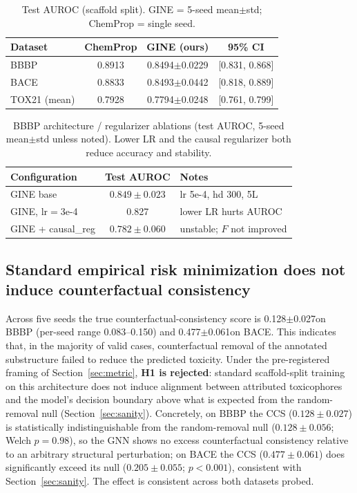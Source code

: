 \documentclass[conference]{IEEEtran}
\newcommand{\BBBPauc}{0.8494}
\newcommand{\BBBPaucsd}{0.0229}
\newcommand{\BACEauc}{0.8493}
\newcommand{\BACEaucsd}{0.0442}
\newcommand{\TOXauc}{0.7794}
\newcommand{\TOXaucsd}{0.0248}
\newcommand{\ChemBBBP}{0.8913}
\newcommand{\ChemBACE}{0.8833}
\newcommand{\ChemTOX}{0.7928}
\newcommand{\Fcausalstd}{0.128}
\newcommand{\Fcausalstdsd}{0.027} %
\newcommand{\BACEcausalstd}{0.477}
\newcommand{\BACEcausalstdsd}{0.061} %
\begin{document}
\begin{table}[t]
\centering
\caption{Test AUROC (scaffold split). GINE = 5-seed mean$\pm$std; ChemProp = single seed.}
\label{tab:auroc}
\begin{tabular}{lccc}
\toprule
Dataset & ChemProp & GINE (ours) & 95\% CI \\
\midrule
BBBP & \ChemBBBP & \BBBPauc$\pm$\BBBPaucsd & [0.831, 0.868] \\
BACE & \ChemBACE & \BACEauc$\pm$\BACEaucsd & [0.818, 0.889] \\
TOX21 (mean) & \ChemTOX & \TOXauc$\pm$\TOXaucsd & [0.761, 0.799] \\
\bottomrule
\end{tabular}
\end{table}

\begin{table}[t]
\centering
\caption{BBBP architecture / regularizer ablations (test AUROC, 5-seed mean$\pm$std unless noted). Lower LR and the causal regularizer both reduce accuracy and stability.}
\label{tab:abl}
\begin{tabular}{l c l}
\toprule
Configuration & Test AUROC & Notes \\
\midrule
GINE base & $0.849\pm0.023$ & lr 5e-4, hd 300, 5L \\
GINE, lr$=$3e-4 & 0.827 & lower LR hurts AUROC \\
GINE + causal\_reg & $0.782\pm0.060$ & unstable; $F$ not improved \\
\bottomrule
\end{tabular}
\end{table}

\subsection{Standard empirical risk minimization does not induce counterfactual consistency}
\label{sec:nullres}
Across five seeds the true counterfactual-consistency score is \Fcausalstd$\pm$\Fcausalstdsd on BBBP (per-seed range 0.083--0.150) and \BACEcausalstd$\pm$\BACEcausalstdsd on BACE. This indicates that, in the majority of valid cases, counterfactual removal of the annotated substructure failed to reduce the predicted toxicity. Under the pre-registered framing of Section~\ref{sec:metric}, \textbf{H1 is rejected}: standard scaffold-split training on this architecture does not induce alignment between attributed toxicophores and the model's decision boundary above what is expected from the random-removal null (Section~\ref{sec:sanity}). Concretely, on BBBP the CCS ($0.128\pm0.027$) is statistically indistinguishable from the random-removal null ($0.128\pm0.056$; Welch $p=0.98$), so the GNN shows no excess counterfactual consistency relative to an arbitrary structural perturbation; on BACE the CCS ($0.477\pm0.061$) does significantly exceed its null ($0.205\pm0.055$; $p<0.001$), consistent with Section~\ref{sec:sanity}. The effect is consistent across both datasets probed.
\end{document}
